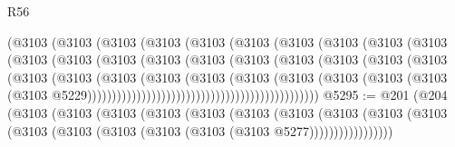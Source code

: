 \begin{lexlean}{R56}
\begin{coremodule}
                                    (@3103
                                      (@3103
                                        (@3103
                                          (@3103
                                            (@3103
                                              (@3103
                                                (@3103
                                                  (@3103
                                                    (@3103
                                                      (@3103
                                                        (@3103
                                                          (@3103
                                                            (@3103
                                                              (@3103
                                                                (@3103
                                                                  (@3103
                                                                    (@3103
                                                                      (@3103
                                                                        (@3103
                                                                          (@3103
                                                                            (@3103
                                                                              (@3103
                                                                                (@3103
                                                                                  (@3103
                                                                                    (@3103
                                                                                      (@3103
                                                                                        (@3103
                                                                                          (@3103
                                                                                            (@3103
                                                                                              (@3103
                                                                                                (@3103
                                                                                                  @5229)))))))))))))))))))))))))))))))))))))))))))))))
@5295 := @201
    (@204
      (@3103
        (@3103
          (@3103
            (@3103
              (@3103
                (@3103
                  (@3103
                    (@3103
                      (@3103 (@3103 (@3103 (@3103 (@3103 (@3103 (@3103 (@3103 @5277)))))))))))))))))

\end{coremodule}
\end{lexlean}
